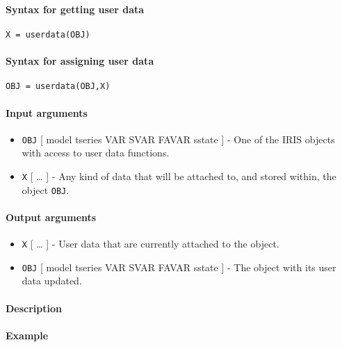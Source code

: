 


	\paragraph{Syntax for getting user
data}

\begin{verbatim}
X = userdata(OBJ)
\end{verbatim}

\paragraph{Syntax for assigning user
data}

\begin{verbatim}
OBJ = userdata(OBJ,X)
\end{verbatim}

\paragraph{Input arguments}

\begin{itemize}
\item
  \texttt{OBJ} {[} model \textbar{} tseries \textbar{} VAR \textbar{}
  SVAR \textbar{} FAVAR \textbar{} sstate {]} - One of the IRIS objects
  with access to user data functions.
\item
  \texttt{X} {[} \ldots{} {]} - Any kind of data that will be attached
  to, and stored within, the object \texttt{OBJ}.
\end{itemize}

\paragraph{Output arguments}

\begin{itemize}
\item
  \texttt{X} {[} \ldots{} {]} - User data that are currently attached to
  the object.
\item
  \texttt{OBJ} {[} model \textbar{} tseries \textbar{} VAR \textbar{}
  SVAR \textbar{} FAVAR \textbar{} sstate {]} - The object with its user
  data updated.
\end{itemize}

\paragraph{Description}

\paragraph{Example}


